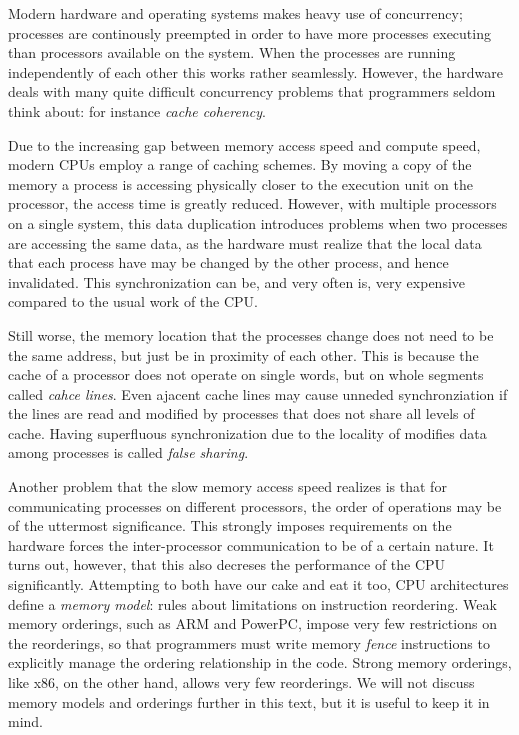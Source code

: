 Modern hardware and operating systems makes heavy use of concurrency; processes are continously
preempted in order to have more processes executing than processors available on the system.  When
the processes are running independently of each other this works rather seamlessly.  However, the
hardware deals with many quite difficult concurrency problems that programmers seldom think about:
for instance \emph{cache coherency}.

Due to the increasing gap between memory access speed and compute speed, modern CPUs employ a range
of caching schemes. By moving a copy of the memory a process is accessing physically closer to the
execution unit on the processor, the access time is greatly reduced. However, with multiple
processors on a single system, this data duplication introduces problems when two processes are
accessing the same data, as the hardware must realize that the local data that each process have
may be changed by the other process, and hence invalidated. This synchronization can be, and very
often is, very expensive compared to the usual work of the CPU\@.

Still worse, the memory location that the processes change does not need to be the same address,
but just be in proximity of each other. This is because the cache of a processor does not operate
on single words, but on whole segments called \emph{cahce lines}. Even ajacent cache lines may
cause unneded synchronziation if the lines are read and modified by processes that does not share
all levels of cache. Having superfluous synchronization due to the locality of modifies data among
processes is called \emph{false sharing}.

Another problem that the slow memory access speed realizes is that for communicating processes on
different processors, the order of operations may be of the uttermost significance. This strongly
imposes requirements on the hardware forces the inter-processor communication to be of a certain
nature. It turns out, however, that this also decreses the performance of the CPU significantly.
Attempting to both have our cake and eat it too, CPU architectures define a \emph{memory model}:
rules about limitations on instruction reordering. Weak memory orderings, such as ARM and PowerPC,
impose very few restrictions on the reorderings, so that programmers must write memory \emph{fence}
instructions to explicitly manage the ordering relationship in the code. Strong memory orderings,
like x86, on the other hand, allows very few reorderings. We will not discuss memory models and
orderings further in this text, but it is useful to keep it in mind.

